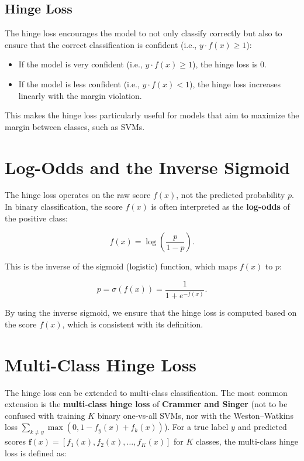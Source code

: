\begin{notechapter}
\subsection{Hinge Loss}
The hinge loss encourages the model to not only classify correctly 
but also to ensure that the correct classification is confident (i.e., 
\( y \cdot f(x) \geq 1 \)):

\begin{itemize}
    \item If the model is very confident (i.e., \( y \cdot f(x) \geq 1 \)), 
          the hinge loss is 0.
    \item If the model is less confident (i.e., \( y \cdot f(x) < 1 \)), 
          the hinge loss increases linearly with the margin violation.
\end{itemize}

This makes the hinge loss particularly useful for models that aim to 
maximize the margin between classes, such as SVMs.

\section{Log-Odds and the Inverse Sigmoid}

The hinge loss operates on the raw score \( f(x) \), not the predicted 
probability \( p \). In binary classification, the score \( f(x) \) is 
often interpreted as the \textbf{log-odds} of the positive class:

\[
f(x) = \log\left(\frac{p}{1 - p}\right).
\]

This is the inverse of the sigmoid (logistic) function, which maps 
\( f(x) \) to \( p \):

\[
p = \sigma(f(x)) = \frac{1}{1 + e^{-f(x)}}.
\]

By using the inverse sigmoid, we ensure that the hinge loss is computed 
based on the score \( f(x) \), which is consistent with its definition.

\section{Multi-Class Hinge Loss}

The hinge loss can be extended to multi-class classification. The 
most common extension is the \textbf{multi-class hinge loss} of
\textbf{Crammer and Singer} (not to be confused with training \( K \) binary
one-vs-all SVMs, nor with the Weston--Watkins loss \( \sum_{k\neq y}\max(0, 1 - f_y(x) + f_k(x)) \)). 
For a true label \( y \) and predicted scores \( \mathbf{f}(x) = [f_1(x), 
f_2(x), \dots, f_K(x)] \) for \( K \) classes, the multi-class hinge 
loss is defined as:


\end{notechapter}
